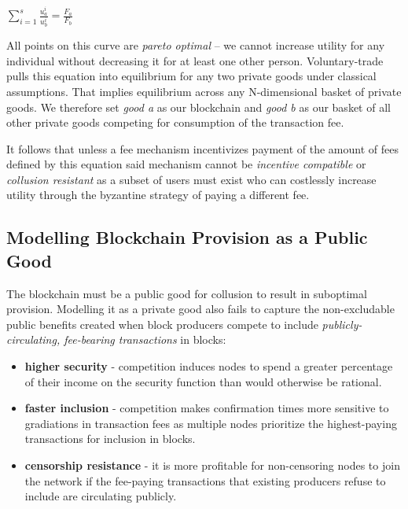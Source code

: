 \documentclass[oneside]{article}   	%
\begin{document}
\LARGE
\begin{adjustwidth}{1.5em}{1.5em} 
\begin{math}
\sum_{i=1}^{s} \frac{u_a^i}{u_b^i} = \frac{F_a}{F_b}
\end{math}
\end{adjustwidth}
\normalsize

All points on this curve are \textit{pareto optimal} -- we cannot increase utility for any individual without decreasing it for at least one other person. Voluntary-trade pulls this equation into equilibrium for any two private goods under classical assumptions. That implies equilibrium across any N-dimensional basket of private goods. We therefore set \textit{good a} as our blockchain and \textit{good b} as our basket of all other private goods competing for consumption of the transaction fee.

It follows that unless a fee mechanism incentivizes payment of the amount of fees defined by this equation said mechanism cannot be \textit{incentive compatible} or \textit{collusion resistant} as a subset of users must exist who can costlessly increase utility through the byzantine strategy of paying a different fee.

\subsection*{Modelling Blockchain Provision as a Public Good}

The blockchain must be a public good for collusion to result in suboptimal provision. Modelling it as a private good also fails to capture the non-excludable public benefits created when block producers compete to include \textit{publicly-circulating, fee-bearing transactions} in blocks:

\begin{itemize}
  \item \textbf{higher security} - competition induces nodes to spend a greater percentage of their income on the security function than would otherwise be rational.
  \item \textbf{faster inclusion} - competition makes confirmation times more sensitive to gradiations in transaction fees as multiple nodes prioritize the highest-paying transactions for inclusion in blocks.
  \item \textbf{censorship resistance} - it is more profitable for non-censoring nodes to join the network if the fee-paying transactions that existing producers refuse to include are circulating publicly.
\end{itemize}
\end{document}

